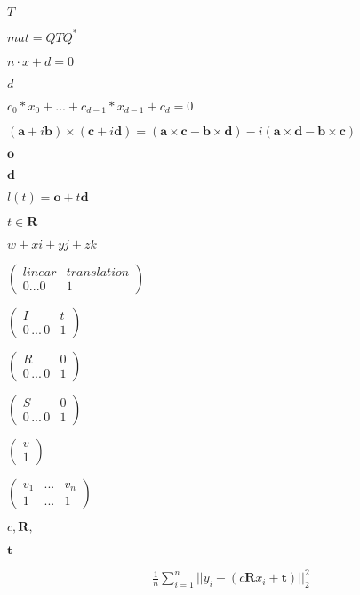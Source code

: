 \documentclass{article}
\begin{document}
$ T $
\pagebreak

$ mat = Q T Q^* $
\pagebreak

$ n \cdot x + d = 0 $
\pagebreak

$ d $
\pagebreak

$ c_0*x_0 + ... + c_{d-1}*x_{d-1} + c_d = 0 $
\pagebreak

$ (\mathbf{a}+i\mathbf{b}) \times (\mathbf{c}+i\mathbf{d}) = (\mathbf{a} \times \mathbf{c} - \mathbf{b} \times \mathbf{d}) - i(\mathbf{a} \times \mathbf{d} - \mathbf{b} \times \mathbf{c})$
\pagebreak

$ \mathbf{o} $
\pagebreak

$ \mathbf{d} $
\pagebreak

$ l(t) = \mathbf{o} + t \mathbf{d} $
\pagebreak

$ t \in \mathbf{R} $
\pagebreak

$ w+xi+yj+zk $
\pagebreak

$ \left( \begin{array}{cc}
 linear & translation\\
 0 ... 0 & 1
 \end{array} \right) $
\pagebreak

$ \left( \begin{array}{cc}
 I & t \\
 0\,...\,0 & 1
 \end{array} \right) $
\pagebreak

$ \left( \begin{array}{cc}
 R & 0\\
 0\,...\,0 & 1
 \end{array} \right) $
\pagebreak

$ \left( \begin{array}{cc}
 S & 0\\
 0\,...\,0 & 1
 \end{array} \right) $
\pagebreak

$ \left( \begin{array}{c}
 v\\
 1
 \end{array} \right) $
\pagebreak

$ \left( \begin{array}{ccc}
 v_1 & ... & v_n\\
 1 & ... & 1
 \end{array} \right) $
\pagebreak

$ c, \mathbf{R}, $
\pagebreak

$ \mathbf{t} $
\pagebreak

\begin{align*}  \frac{1}{n} \sum_{i=1}^n \vert\vert y_i - (c\mathbf{R}x_i + \mathbf{t}) \vert\vert_2^2
\end{align*}
\pagebreak
\end{document}
